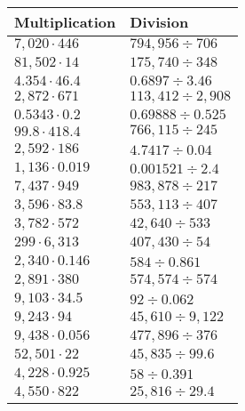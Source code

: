 \begin{longtable}[]{@{}ll@{}}
\toprule
Multiplication & Division\tabularnewline
\midrule
\endhead
\(7,020\cdot446\) & \(794,956÷706\)\tabularnewline
\(81,502\cdot14\) & \(175,740 ÷348\)\tabularnewline
\(4.354\cdot46.4\) & \(0.6897÷3.46\)\tabularnewline
\(2,872\cdot671\) & \(113,412÷2,908\)\tabularnewline
\(0.5343\cdot0.2\) & \(0.69888÷0.525\)\tabularnewline
\(99.8\cdot418.4\) & \(766,115÷245\)\tabularnewline
\(2,592\cdot186\) & \(4.7417÷0.04\)\tabularnewline
\(1,136\cdot0.019\) & \(0.001521÷2.4\)\tabularnewline
\(7,437\cdot949\) & \(983,878÷217\)\tabularnewline
\(3,596\cdot83.8\) & \(553,113÷407\)\tabularnewline
\(3,782\cdot572\) & \(42,640÷533\)\tabularnewline
\(299\cdot6,313\) & \(407,430÷54\)\tabularnewline
\(2,340\cdot0.146\) & \(584÷0.861\)\tabularnewline
\(2,891\cdot380\) & \(574,574÷574\)\tabularnewline
\(9,103\cdot34.5\) & \(92÷0.062\)\tabularnewline
\(9,243\cdot94\) & \(45,610÷9,122\)\tabularnewline
\(9,438\cdot0.056\) & \(477,896÷376\)\tabularnewline
\(52,501\cdot22\) & \(45,835÷99.6\)\tabularnewline
\(4,228\cdot0.925\) & \(58÷0.391\)\tabularnewline
\(4,550\cdot822\) & \(25,816÷29.4\)\tabularnewline
\bottomrule
\end{longtable}
